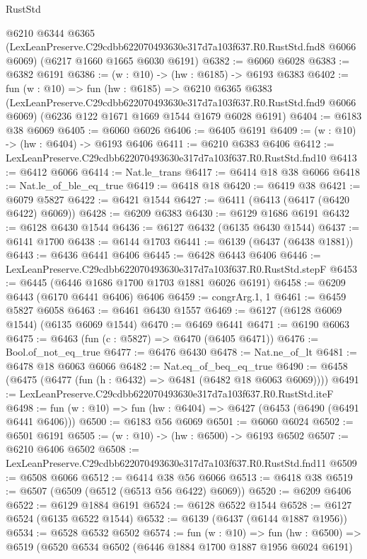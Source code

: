 \begin{lexlean}{RustStd}
\begin{coremodule}
  @6210
    @6344
    @6365
    (LexLeanPreserve.C29cdbb622070493630e317d7a103f637.R0.RustStd.fnd8 @6066 @6069)
    (@6217 @1660 @1665 @6030 @6191)
@6382 := @6060 @6028
@6383 := @6382 @6191
@6386 := (w : @10) -> (hw : @6185) -> @6193 @6383
@6402 := fun (w : @10) =>
  fun (hw : @6185) =>
  @6210
    @6365
    @6383
    (LexLeanPreserve.C29cdbb622070493630e317d7a103f637.R0.RustStd.fnd9 @6066 @6069)
    (@6236 @122 @1671 @1669 @1544 @1679 @6028 @6191)
@6404 := @6183 @38 @6069
@6405 := @6060 @6026
@6406 := @6405 @6191
@6409 := (w : @10) -> (hw : @6404) -> @6193 @6406
@6411 := @6210 @6383 @6406
@6412 := LexLeanPreserve.C29cdbb622070493630e317d7a103f637.R0.RustStd.fnd10
@6413 := @6412 @6066
@6414 := Nat.le_trans
@6417 := @6414 @18 @38 @6066
@6418 := Nat.le_of_ble_eq_true
@6419 := @6418 @18
@6420 := @6419 @38
@6421 := @6079 @5827
@6422 := @6421 @1544
@6427 := @6411 (@6413 (@6417 (@6420 @6422) @6069))
@6428 := @6209 @6383
@6430 := @6129 @1686 @6191
@6432 := @6128 @6430 @1544
@6436 := @6127 @6432 (@6135 @6430 @1544)
@6437 := @6141 @1700
@6438 := @6144 @1703
@6441 := @6139 (@6437 (@6438 @1881))
@6443 := @6436 @6441 @6406
@6445 := @6428 @6443 @6406
@6446 := LexLeanPreserve.C29cdbb622070493630e317d7a103f637.R0.RustStd.stepF
@6453 := @6445 (@6446 @1686 @1700 @1703 @1881 @6026 @6191)
@6458 := @6209 @6443 (@6170 @6441 @6406) @6406
@6459 := congrArg.{1, 1}
@6461 := @6459 @5827 @6058
@6463 := @6461 @6430 @1557
@6469 := @6127 (@6128 @6069 @1544) (@6135 @6069 @1544)
@6470 := @6469 @6441
@6471 := @6190 @6063
@6475 := @6463 (fun (c : @5827) => @6470 (@6405 @6471))
@6476 := Bool.of_not_eq_true
@6477 := @6476 @6430
@6478 := Nat.ne_of_lt
@6481 := @6478 @18 @6063 @6066
@6482 := Nat.eq_of_beq_eq_true
@6490 := @6458 (@6475 (@6477 (fun (h : @6432) => @6481 (@6482 @18 @6063 @6069))))
@6491 := LexLeanPreserve.C29cdbb622070493630e317d7a103f637.R0.RustStd.iteF
@6498 := fun (w : @10) => fun (hw : @6404) => @6427 (@6453 (@6490 (@6491 @6441 @6406)))
@6500 := @6183 @56 @6069
@6501 := @6060 @6024
@6502 := @6501 @6191
@6505 := (w : @10) -> (hw : @6500) -> @6193 @6502
@6507 := @6210 @6406 @6502
@6508 := LexLeanPreserve.C29cdbb622070493630e317d7a103f637.R0.RustStd.fnd11
@6509 := @6508 @6066
@6512 := @6414 @38 @56 @6066
@6513 := @6418 @38
@6519 := @6507 (@6509 (@6512 (@6513 @56 @6422) @6069))
@6520 := @6209 @6406
@6522 := @6129 @1884 @6191
@6524 := @6128 @6522 @1544
@6528 := @6127 @6524 (@6135 @6522 @1544)
@6532 := @6139 (@6437 (@6144 @1887 @1956))
@6534 := @6528 @6532 @6502
@6574 := fun (w : @10) =>
  fun (hw : @6500) =>
  @6519
    (@6520
      @6534
      @6502
      (@6446 @1884 @1700 @1887 @1956 @6024 @6191)

\end{coremodule}
\end{lexlean}
